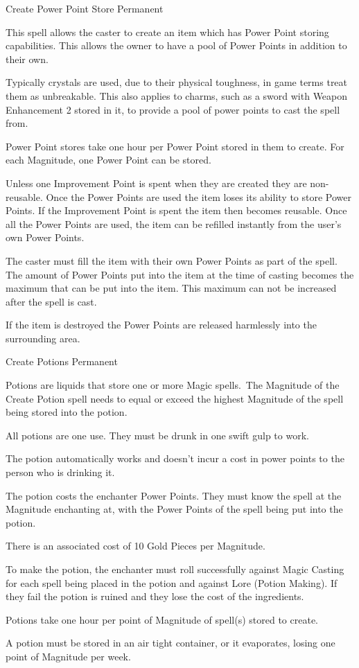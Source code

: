 \begin{rpg-spell}
{Create Power Point Store}
{Permanent}

This spell allows the caster to create an item which has Power Point storing capabilities. This allows the owner to have a pool of Power Points in addition to their own.

Typically crystals are used, due to their physical toughness, in game terms treat them as unbreakable. This also applies to charms, such as a sword with Weapon Enhancement 2 stored in it, to provide a pool of power points to cast the spell from.

Power Point stores take one hour per Power Point stored in them to create. For each Magnitude, one Power Point can be stored.

Unless one Improvement Point is spent when they are created they are non-reusable. Once the Power Points are used the item loses its ability to store Power Points. If the Improvement Point is spent the item then becomes reusable. Once all the Power Points are used, the item can be refilled instantly from the user’s own Power Points.

The caster must fill the item with their own Power Points as part of the spell. The amount of Power Points put into the item at the time of casting becomes the maximum that can be put into the item. This maximum can not be increased after the spell is cast.

If the item is destroyed the Power Points are released harmlessly into the surrounding area.
\end{rpg-spell}


\begin{rpg-spell}
{Create Potions}
{Permanent}

Potions are liquids that store one or more Magic spells. The Magnitude of the Create Potion spell needs to equal or exceed the highest Magnitude of the spell being stored into the potion.

\begin{rpg-list}
\item All potions are one use. They must be drunk in one swift gulp to work. 
\item The potion automatically works and doesn’t incur a cost in power points to the person who is drinking it. 
\item The potion costs the enchanter Power Points. They must know the spell at the Magnitude enchanting at, with the Power Points of the spell being put into the potion. 
\item There is an associated cost of 10 Gold Pieces per Magnitude. 
\item To make the potion, the enchanter must roll successfully against Magic Casting for each spell being placed in the potion and against Lore (Potion Making). If they fail the potion is ruined and they lose the cost of the ingredients. 
\item Potions take one hour per point of Magnitude of spell(s) stored to create. 
\item A potion must be stored in an air tight container, or it evaporates, losing one point of Magnitude per week. 
\end{rpg-list}
\end{rpg-spell}


